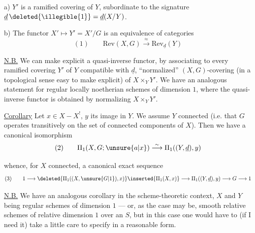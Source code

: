 
a) $Y'$ is   a ramified covering of $Y$, subordinate to the signature $\underline d\,\deleted{\illegible{1}}=\underline d(X/Y)$.

b) The functor $X'\longmapsto Y'=X'/G$ is an equivalence of categories
\[
(1)\qquad \mathrm{Rev}(X,G)\overset{\approx}{\longrightarrow}\mathrm{Rev}_{\underline d}(Y)
\]

\uline{N.B.} We can make explicit a quasi-inverse functor, by associating to every ramified covering $Y'$ of $Y$ compatible with $\underline d$,   ``normalized'' $(X,G)$-covering (in a topological sense easy to make explicit) of $X\times_Y Y'$. We have an analogous statement for regular locally noetherian schemes of dimension $1$, where the quasi-inverse functor is obtained by normalizing $X\times_Y Y'$.

\uline{Corollary} Let $x\in X-X^{!}$, $y$ its image in $Y$. We assume $Y$ connected (i.e. that $G$ operates transitively on the set of connected components of $X$). Then we have a canonical isomorphism
\[
(2)\qquad \Pi_1(X,G;\unsure{a|x})\overset{\sim}{\longrightarrow}\Pi_1((Y,\underline d),y)
\]


whence, for $X$ connected, a canonical exact sequence
\[
(3)\qquad
1\longrightarrow
\deleted{\Pi_1((X,\unsure{G|1}),x)}\inserted{\Pi_1(X,x)}
\longrightarrow\Pi_1((Y,\underline d),y)\longrightarrow G\longrightarrow 1
\]

\uline{N.B.} We have  an analogous corollary in the scheme-theoretic context, $X$ and $Y$ being regular schemes of dimension $1$ --- or, as the case may be, smooth relative schemes of relative dimension $1$ over an $S$, but in this case one would have to (if I need it) take a little care to specify  in a reasonable form.

